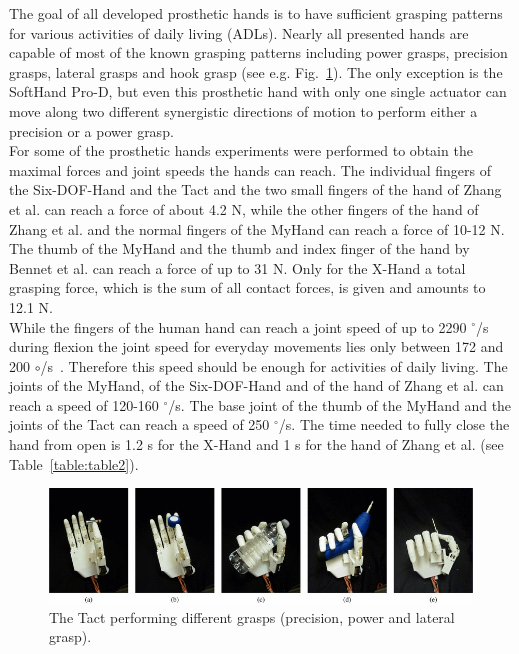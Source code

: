 \documentclass[a4paper, 10pt, conference]{ieeeconf}      %
\begin{document}
The goal of all developed prosthetic hands is to have sufficient grasping patterns for various activities of daily living (ADLs). Nearly all presented hands are capable of most of the known grasping patterns including power grasps, precision grasps, lateral grasps and hook grasp (see e.g. Fig.~\ref{fig:grasps}). The only exception is the SoftHand Pro-D, but even this prosthetic hand with only one single actuator can move along two different synergistic directions of motion to perform either a precision or a power grasp.\\
For some of the prosthetic hands experiments were performed to obtain the maximal forces and joint speeds the hands can reach. The individual fingers of the Six-DOF-Hand and the Tact and the two small fingers of the hand of Zhang et al. can reach a force of about 4.2 N, while the other fingers of the hand of Zhang et al. and the normal fingers of the MyHand can reach a force of 10-12 N. The thumb of the MyHand and the thumb and index finger of the hand by Bennet et al. can reach a force of up to 31 N. Only for the X-Hand a total grasping force, which is the sum of all contact forces, is given and amounts to 12.1 N.\\
While the fingers of the human hand can reach a joint speed of up to 2290 $^\circ$/s during flexion the joint speed for everyday movements lies only between 172 and 200 $\circ$/s~\cite{weir}. Therefore this speed should be enough for activities of daily living. The joints of the MyHand, of the Six-DOF-Hand and of the hand of Zhang et al. can reach a speed of 120-160 $^\circ$/s. The base joint of the thumb of the MyHand and the joints of the Tact can reach a speed of 250 $^\circ$/s. The time needed to fully close the hand from open is 1.2 s for the X-Hand and 1 s for the hand of Zhang et al. (see Table~\ref{table:table2}).

\begin{figure}[h]

	\centering
	\includegraphics[scale=0.4]{images/Tact2}
		
	\caption{The Tact performing different grasps (precision, power and lateral grasp).}
	\label{fig:grasps}
\end{figure}
\end{document}
